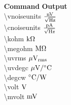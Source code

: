 \documentclass{article}
\begin{document}
    \begin{tabbing}
    \textbf{Command}            \hspace{5cm}\= \textbf{Output} \\

    \textbackslash vnoiseunits \> $\vnoiseunits$ \\
    \textbackslash cnoiseunits \> $\cnoiseunits$ \\
    \textbackslash kohm        \> $\kohm$ \\
    \textbackslash megohm      \> $\megohm$ \\
    \textbackslash uvrms       \> $\uvrms$ \\
    \textbackslash uvdegc       \> $\uvdegc$ \\
    \textbackslash degcw       \> $\degcw$ \\
    \textbackslash volt       \> $\volt$ \\
    \textbackslash mvolt       \> $\mvolt$ \\
    \end{tabbing}
\end{document}
